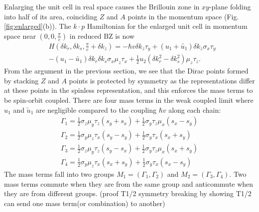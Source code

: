 Enlarging the unit cell in real space causes the Brillouin zone in $xy$-plane folding into half of its area, coinciding $Z$ and $A$ points in the momentum space (Fig.\ref{fig:enlarged}(b)). The $k \cdot p$ Hamiltonian for the enlarged unit cell in momentum space near $(0, 0, \frac{\pi}{c})$ in reduced BZ is now
\begin{eqnarray}
    &H (\delta k_r, \delta k_s, \frac{\pi}{c} + \delta k_z ) = - \hbar v \delta k_z \tau_y + (u_1 + \tilde{u_1}) \delta k_z \sigma_x \tau_y \nonumber \\ &- (u_1 - \tilde{u_1}) \delta k_r \delta k_s \sigma_x \mu_z \tau_x + \frac{1}{2} u_2 (\delta k_r^2 - \delta k_s^2) \mu_z \tau_z .
\end{eqnarray}
From the argument in the previous section, we see that the Dirac points formed by stacking $Z$ and $A$ points is protected by symmetry as the representations differ at these points in the spinless representation, and this enforces the  mass terms to be spin-orbit coupled. There are four mass terms in the weak coupled limit where $u_1$ and $\tilde{u}_1$ are negligible compared to the coupling $\hbar v$ along each chain: 
\begin{equation}
\begin{split}
\Gamma_1=\frac{1}{2}\sigma_z\mu_y\tau_z(s_y+s_x)+\frac{1}{2}\sigma_y\tau_z\mu_x(s_x-s_y)\\
\Gamma_2=\frac{1}{2}\sigma_y\mu_z\tau_x(s_y-s_y)+\frac{1}{2}\sigma_y\tau_x(s_x+s_y)\\
\Gamma_3 =\frac{1}{2}\sigma_z\mu_y\tau_z(s_y-s_x)+\frac{1}{2}\sigma_y\tau_z\mu_x(s_x+s_y) \\
\Gamma_4= \frac{1}{2}\sigma_y\mu_z\tau_x(s_x+s_y)+\frac{1}{2}\sigma_y\tau_x(s_x-s_y)
\end{split}
\end{equation}
{\color{blue}The mass terms fall into two groups $M_1=(\Gamma_1,\Gamma_2)$ and $M_2=(\Gamma_3,\Gamma_4)$. Two mass terms commute when they are from the same group and anticommute when they are from different groups.}
{\color{red}(proof T1/2 symmetry breaking by showing T1/2 can send one mass term(or combination) to another)}





